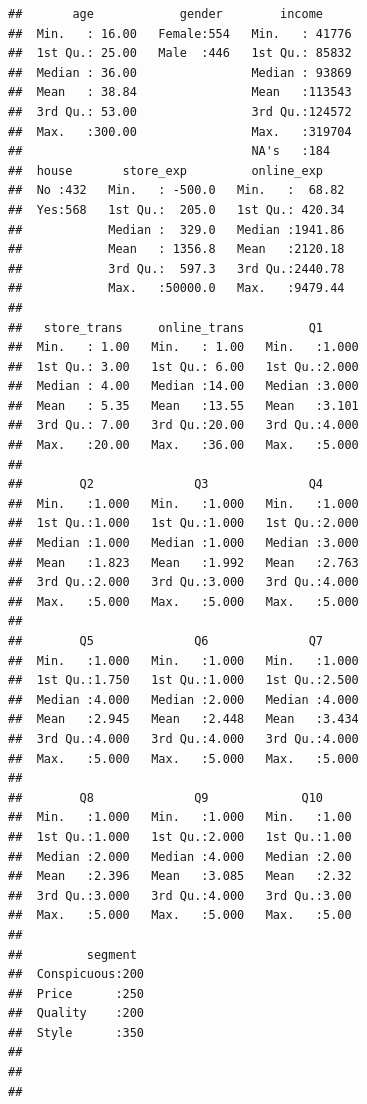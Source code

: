 \documentclass[12pt,]{krantz}
\theoremstyle{definition}
\theoremstyle{definition}
\theoremstyle{remark}
\begin{document}
\begin{verbatim}
##       age            gender        income      
##  Min.   : 16.00   Female:554   Min.   : 41776  
##  1st Qu.: 25.00   Male  :446   1st Qu.: 85832  
##  Median : 36.00                Median : 93869  
##  Mean   : 38.84                Mean   :113543  
##  3rd Qu.: 53.00                3rd Qu.:124572  
##  Max.   :300.00                Max.   :319704  
##                                NA's   :184     
##  house       store_exp         online_exp     
##  No :432   Min.   : -500.0   Min.   :  68.82  
##  Yes:568   1st Qu.:  205.0   1st Qu.: 420.34  
##            Median :  329.0   Median :1941.86  
##            Mean   : 1356.8   Mean   :2120.18  
##            3rd Qu.:  597.3   3rd Qu.:2440.78  
##            Max.   :50000.0   Max.   :9479.44  
##                                               
##   store_trans     online_trans         Q1       
##  Min.   : 1.00   Min.   : 1.00   Min.   :1.000  
##  1st Qu.: 3.00   1st Qu.: 6.00   1st Qu.:2.000  
##  Median : 4.00   Median :14.00   Median :3.000  
##  Mean   : 5.35   Mean   :13.55   Mean   :3.101  
##  3rd Qu.: 7.00   3rd Qu.:20.00   3rd Qu.:4.000  
##  Max.   :20.00   Max.   :36.00   Max.   :5.000  
##                                                 
##        Q2              Q3              Q4       
##  Min.   :1.000   Min.   :1.000   Min.   :1.000  
##  1st Qu.:1.000   1st Qu.:1.000   1st Qu.:2.000  
##  Median :1.000   Median :1.000   Median :3.000  
##  Mean   :1.823   Mean   :1.992   Mean   :2.763  
##  3rd Qu.:2.000   3rd Qu.:3.000   3rd Qu.:4.000  
##  Max.   :5.000   Max.   :5.000   Max.   :5.000  
##                                                 
##        Q5              Q6              Q7       
##  Min.   :1.000   Min.   :1.000   Min.   :1.000  
##  1st Qu.:1.750   1st Qu.:1.000   1st Qu.:2.500  
##  Median :4.000   Median :2.000   Median :4.000  
##  Mean   :2.945   Mean   :2.448   Mean   :3.434  
##  3rd Qu.:4.000   3rd Qu.:4.000   3rd Qu.:4.000  
##  Max.   :5.000   Max.   :5.000   Max.   :5.000  
##                                                 
##        Q8              Q9             Q10      
##  Min.   :1.000   Min.   :1.000   Min.   :1.00  
##  1st Qu.:1.000   1st Qu.:2.000   1st Qu.:1.00  
##  Median :2.000   Median :4.000   Median :2.00  
##  Mean   :2.396   Mean   :3.085   Mean   :2.32  
##  3rd Qu.:3.000   3rd Qu.:4.000   3rd Qu.:3.00  
##  Max.   :5.000   Max.   :5.000   Max.   :5.00  
##                                                
##         segment   
##  Conspicuous:200  
##  Price      :250  
##  Quality    :200  
##  Style      :350  
##                   
##                   
## 
\end{verbatim}
\end{document}
